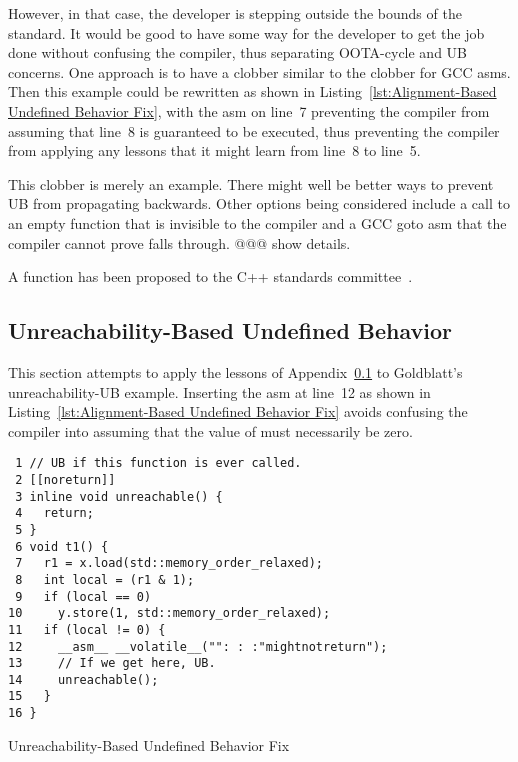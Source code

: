 \documentclass[10]{article}
\begin{document}
However, in that case, the developer is stepping outside the bounds
of the standard.
It would be good to have some way for the developer to get the job
done without confusing the compiler, thus separating OOTA-cycle and
UB concerns.
One approach is to have a  clobber similar to the
 clobber for GCC asms.
Then this example could be rewritten as shown in
Listing~\ref{lst:Alignment-Based Undefined Behavior Fix},
with the asm on line~7 preventing the compiler from assuming that line~8
is guaranteed to be executed, thus preventing the compiler from
applying any lessons that it might learn from line~8 to line~5.


This  clobber is merely an example.
There might well be better ways to prevent UB from propagating backwards.
Other options being considered include a call to an empty function that
is invisible to the compiler and a GCC goto asm that the compiler cannot
prove falls through.
@@@ show details.

A  function has been proposed to the C++ standards
committee~\cite{DavisHerring2021P1494R2}.

\subsection{Unreachability-Based Undefined Behavior}
\label{sec:Unreachability-Based Undefined Behavior}

This section attempts to apply the lessons
of Appendix~\ref{sec:Unreachability-Based Undefined Behavior} to
Goldblatt's unreachability-UB example.  Inserting the asm at line~12
as shown in Listing~\ref{lst:Alignment-Based Undefined Behavior Fix}
avoids confusing the compiler into assuming that the value of 
must necessarily be zero.

\begin{listing}[tbp]
\begin{verbatim}
 1 // UB if this function is ever called.
 2 [[noreturn]]
 3 inline void unreachable() {
 4   return;
 5 }
 6 void t1() {
 7   r1 = x.load(std::memory_order_relaxed);
 8   int local = (r1 & 1);
 9   if (local == 0)
10     y.store(1, std::memory_order_relaxed);
11   if (local != 0) {
12     __asm__ __volatile__("": : :"mightnotreturn");
13     // If we get here, UB.
14     unreachable();
15   }
16 }
\end{verbatim}
\caption{Unreachability-Based Undefined Behavior Fix}
\label{lst:Unreachability-Based Undefined Behavior Fix}
\end{listing}
\end{document}
